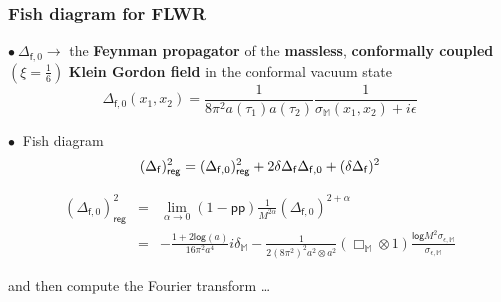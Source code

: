\documentclass[9pt]{beamer}
\renewcommand{\log}{\mathsf{log}}
\newcommand{\pp}{\mathsf{pp}}
\newcommand{\Mbb}{\mathbb{M}}
\newcommand{\fsf}{\mathsf{f}}
\begin{document}
\begin{frame}

\frametitle{Fish diagram for FLWR} 

$\bullet \ \Delta_{\fsf,0} \to$ the \textbf{Feynman propagator} of the \textbf{massless}, \textbf{conformally coupled} $(\xi = \frac16)$ \textbf{Klein Gordon field} in the conformal vacuum state 
\begin{equation*}
\Delta_{\fsf,0}(x_1,x_2)=\frac{1}{8\pi^2 a(\tau_1)a(\tau_2)}\frac{1}{\sigma_{\Mbb}(x_1,x_2)+i\epsilon} 
\end{equation*}

$\bullet \ $ Fish diagram
\vspace*{-12pt}
\begin{equation*}
(\Delta_\fsf)^2_\mathsf{reg} = (\Delta_{\fsf,0})^2_\mathsf{reg} + 2 \delta\Delta_\fsf \Delta_{\fsf,0} + (\delta\Delta_\fsf)^2
\vspace*{-25pt}
\end{equation*}

\begin{eqnarray*}
(\Delta_{\fsf,0})^2_\mathsf{reg} &=& 
\lim_{\alpha\to 0} \left( 1 - \pp \right) \frac{1}{M^{2\alpha}} (\Delta_{\fsf,0})^{2+\alpha} \\
&=& - \frac{1+2\log(a)}{16\pi^2 a^4} i\delta_\Mbb-\frac{1}{2(8\pi^2)^2 a^2\otimes a^2} \left(\Box_{\Mbb}\otimes 1\right)\frac{\log{M^2\sigma_{\epsilon,\Mbb}}}{\sigma_{\epsilon,\Mbb}}
\end{eqnarray*}

and then compute the Fourier transform \dots

\end{frame}




\end{document}
